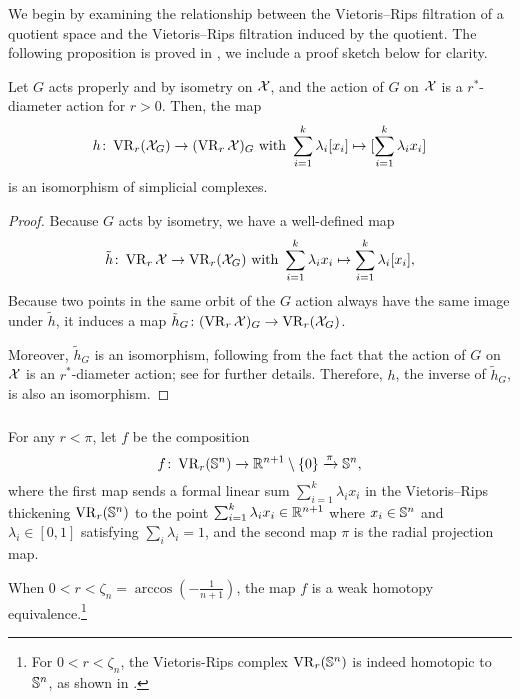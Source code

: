 \subsubsection{}\label{subsub:h}

We begin by examining the relationship between the Vietoris--Rips filtration of a quotient space and the Vietoris--Rips filtration induced by the quotient.
The following proposition is proved in \cite[Proposition 3.5]{adams2022metric}, we include a proof sketch below for clarity.

\medskip\lemma
Let $G$ acts properly and by isometry on $\mathcal{X}$, and the action of $G$ on $\mathcal{X}$ is a $r^*$-diameter action for $r>0$. Then, the map
\[
h \colon \operatorname{VR}_r(\mathcal{X}_G) \to (\operatorname{VR}_r\mathcal{X})_G
\text{ with }
\sum_{i=1}^k \lambda_i [x_i] \mapsto [\sum_{i=1}^k \lambda_i x_i]
\]
is an isomorphism of simplicial complexes.

\begin{proof}
	Because $G$ acts by isometry, we have a well-defined map
	\[
	\tilde{h} \colon \operatorname{VR}_r\mathcal{X} \to \operatorname{VR}_r(\mathcal{X}_G)
	\text{ with }
	\sum_{i=1}^k \lambda_i x_i \mapsto \sum_{i=1}^k \lambda_i [x_i],
	\]
	Because two points in the same orbit of the $G$ action always have the same image under $\tilde{h}$, it induces a map $\tilde{h}_G \colon (\operatorname{VR}_r\mathcal{X})_G \to \operatorname{VR}_r(\mathcal{X}_G)$.

	Moreover, $\tilde{h}_G$ is an isomorphism, following from the fact that the action of $G$ on $\mathcal{X}$ is an $r^*$-diameter action; see \cite[Proposition 3.5]{adams2022metric} for further details.
	Therefore, $h$, the inverse of $\tilde{h}_G$, is also an isomorphism.
\end{proof}

\subsubsection{}
\label{subsub:f}

For any $r<\pi$, let $f$ be the composition
\[
f \colon \operatorname{VR}_r(\mathbb{S}^n) \to \mathbb{R}^{n+1} \setminus \{0\} \xrightarrow{\pi} \mathbb{S}^n,
\]
where the first map sends a formal linear sum $\sum_{i=1}^k \lambda_i x_i$ in the Vietoris--Rips thickening $\operatorname{VR}_r(\mathbb{S}^n)$ to the point $\sum_{i=1}^k \lambda_i x_i \in \mathbb{R}^{n+1}$ where $x_i \in \mathbb{S}^n$ and $\lambda_i \in [0,1]$ satisfying $\sum_i\lambda_i=1$, and the second map $\pi$ is the radial projection map.

\medskip\lemma
When $0<r<\zeta_n=\arccos{(-\tfrac{1}{n+1})}$, the map $f$ is a weak homotopy equivalence.\footnote{For $0<r<\zeta_n$, the Vietoris-Rips complex $\operatorname{VR}_r(\mathbb{S}^n)$ is indeed homotopic to $\mathbb{S}^n$, as shown in \cite[Theorem 7.1]{lim2020vietoris}.}


